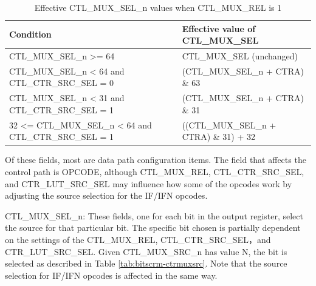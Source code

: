 \documentclass[main\_\_EN.tex]{subfiles}
\begin{document}
\begin{table}[H]
\centering
\caption{Effective CTL\_MUX\_SEL\_n values when CTL\_MUX\_REL is 1}
\label{tab:bitscrm-ctrmuxrel}
\begin{tabular}{|l|l|}
\hline\rowcolor{lightgray}
Condition & Effective value of CTL\_MUX\_SEL \\
\hline
CTL\_MUX\_SEL\_n >= 64 & CTL\_MUX\_SEL (unchanged) \\
CTL\_MUX\_SEL\_n < 64 and CTL\_CTR\_SRC\_SEL = 0 & (CTL\_MUX\_SEL\_n + CTRA) \& 63 \\
CTL\_MUX\_SEL\_n < 31 and CTL\_CTR\_SRC\_SEL = 1 & (CTL\_MUX\_SEL\_n + CTRA) \& 31 \\
32 <= CTL\_MUX\_SEL\_n < 64 and CTL\_CTR\_SRC\_SEL = 1 & ((CTL\_MUX\_SEL\_n + CTRA) \& 31) + 32 \\
\hline
\end{tabular}
\end{table}





Of these fields, most are data path configuration items. The field that affects the control path is OPCODE, although CTL\_MUX\_REL, CTL\_CTR\_SRC\_SEL, and CTR\_LUT\_SRC\_SEL may influence how some of the opcodes work by adjusting the source selection for the IF/IFN opcodes.

CTL\_MUX\_SEL\_n: These fields, one for each bit in the output register, select the source for that particular bit. The specific bit chosen is partially dependent on the settings of the CTL\_MUX\_REL, CTL\_CTR\_SRC\_SEL，and CTR\_LUT\_SRC\_SEL. Given CTL\_MUX\_SRC\_n has value N, the bit is selected as described in Table \ref{tab:bitscrm-ctrmuxsrc}. Note that the source selection for IF/IFN opcodes is affected in the same way.
\end{document}
